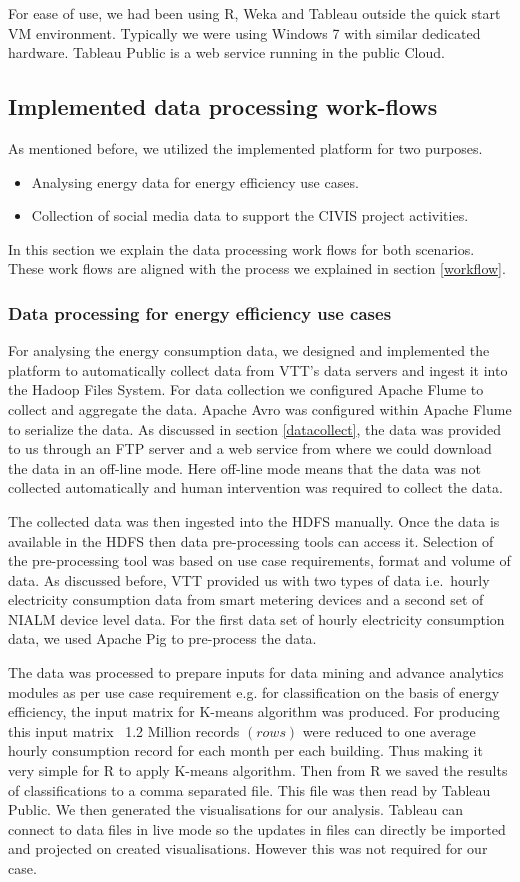 For ease of use, we had been using R, Weka and Tableau outside the quick start VM environment. Typically we were using Windows 7 with similar dedicated hardware. Tableau Public is a web service running in the public Cloud.
\subsection{Implemented data processing work-flows } 
As mentioned before, we utilized the implemented platform for two purposes.
\begin{itemize}
\item Analysing energy data for energy efficiency use cases.
\item Collection of social media data to support the CIVIS project activities. 
\end{itemize}
In this section we explain the data processing work flows for both scenarios. These work flows are aligned with the process we explained in section \ref{workflow}. 
\subsubsection{Data processing for energy efficiency use cases}
For analysing the energy consumption data, we designed and implemented the platform to automatically collect data from VTT's data servers and ingest it into the Hadoop Files System. For data collection we configured Apache Flume to collect and aggregate the data. Apache Avro was configured within Apache Flume to serialize the data. As discussed in section \ref{datacollect}, the 
 data was provided to us through an FTP server and a web service from where we could download the data in an off-line mode. Here off-line mode means that the data was not collected automatically and human intervention was required to collect the data.

The collected data was then ingested into the HDFS manually. Once the data is available in the HDFS then data pre-processing tools can access it. Selection of the pre-processing tool was based on use case requirements, format and volume of data. As discussed before, VTT provided us with two types of data i.e.\ hourly electricity consumption data from smart metering devices and a second set of NIALM device level data. For the first data set of hourly electricity consumption data, we used Apache Pig to pre-process the data. 

 The data was processed to prepare inputs for data mining and advance analytics modules as per use case requirement e.g. for classification on the basis of energy efficiency, the input matrix for K-means algorithm was produced. For producing this input matrix ~1.2 Million records \((rows)\) were reduced to one average hourly consumption record for each month per each building. Thus making it very simple for R to apply K-means algorithm. Then from R we saved the results of classifications to a comma separated file. This file was then read by Tableau Public. We then generated the visualisations for our analysis. Tableau can connect to data files in live mode so the updates in files can directly be imported and projected on created visualisations. However this was not required for our case.
 
